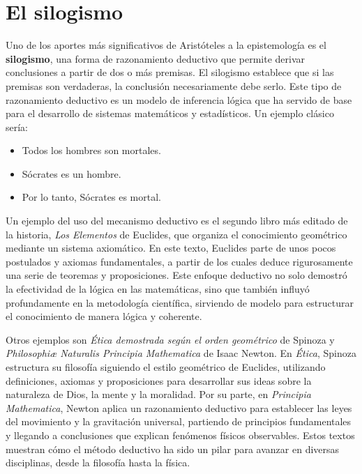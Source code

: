 \documentclass[
  letterpaper,
  DIV=11,
  numbers=noendperiod]{scrreprt}
\providecommand{\tightlist}{%
  \setlength{\itemsep}{0pt}\setlength{\parskip}{0pt}}\usepackage{longtable,booktabs,array}
\begin{document}
\section{El silogismo}\label{el-silogismo}

Uno de los aportes más significativos de Aristóteles a la epistemología
es el \textbf{silogismo}, una forma de razonamiento deductivo que
permite derivar conclusiones a partir de dos o más premisas. El
silogismo establece que si las premisas son verdaderas, la conclusión
necesariamente debe serlo. Este tipo de razonamiento deductivo es un
modelo de inferencia lógica que ha servido de base para el desarrollo de
sistemas matemáticos y estadísticos. Un ejemplo clásico sería:

\begin{itemize}
\tightlist
\item
  Todos los hombres son mortales.\\
\item
  Sócrates es un hombre.\\
\item
  Por lo tanto, Sócrates es mortal.
\end{itemize}

Un ejemplo del uso del mecanismo deductivo es el segundo libro más
editado de la historia, \emph{Los Elementos} de Euclides, que organiza
el conocimiento geométrico mediante un sistema axiomático. En este
texto, Euclides parte de unos pocos postulados y axiomas fundamentales,
a partir de los cuales deduce rigurosamente una serie de teoremas y
proposiciones. Este enfoque deductivo no solo demostró la efectividad de
la lógica en las matemáticas, sino que también influyó profundamente en
la metodología científica, sirviendo de modelo para estructurar el
conocimiento de manera lógica y coherente.

Otros ejemplos son \emph{Ética demostrada según el orden geométrico} de
Spinoza y \emph{Philosophiæ Naturalis Principia Mathematica} de Isaac
Newton. En \emph{Ética}, Spinoza estructura su filosofía siguiendo el
estilo geométrico de Euclides, utilizando definiciones, axiomas y
proposiciones para desarrollar sus ideas sobre la naturaleza de Dios, la
mente y la moralidad. Por su parte, en \emph{Principia Mathematica},
Newton aplica un razonamiento deductivo para establecer las leyes del
movimiento y la gravitación universal, partiendo de principios
fundamentales y llegando a conclusiones que explican fenómenos físicos
observables. Estos textos muestran cómo el método deductivo ha sido un
pilar para avanzar en diversas disciplinas, desde la filosofía hasta la
física.
\end{document}
